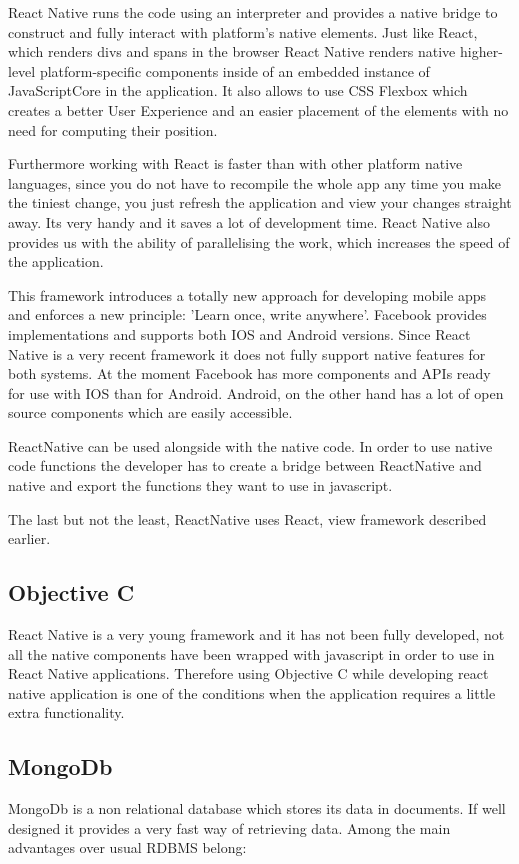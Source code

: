 \documentclass[thesis=M,english]{FITthesis}[2012/10/20]
\begin{document}
React Native runs the code using an interpreter and provides a native bridge to construct and fully interact with platform's native elements. Just like React, which renders divs and spans in the browser React Native renders native higher-level platform-specific components inside of an embedded instance of JavaScriptCore in the application. It also allows to use CSS Flexbox which creates a better User Experience and an easier placement of the elements with no need for computing their position.

Furthermore working with React is faster than with other platform native languages, since you do not have to recompile the whole app any time you make the tiniest change, you just refresh the application and view your changes straight away. Its very handy and it saves a lot of development time. React Native also provides us with the ability of parallelising the work, which increases the speed of the application.

This framework introduces a totally new approach for developing mobile apps and enforces a new principle: 'Learn once, write anywhere'. Facebook provides implementations and supports both IOS and Android versions. Since React Native is a very recent framework it does not fully support native features for both systems. At the moment Facebook has more components and APIs ready for use with IOS than for Android. Android, on the other hand has a lot of open source components which are easily accessible.

ReactNative can be used alongside with the native code. In order to use native code functions the developer has to create a bridge between ReactNative and native and export the functions they want to use in javascript.

The last but not the least, ReactNative uses React, view framework described earlier. \cite{react-fb-native}


\subsection{Objective C}

React Native is a very young framework and it has not been fully developed, not all the native components have been wrapped with javascript in order to use in React Native applications. Therefore using Objective C while developing react native application is one of the conditions when the application requires a little extra functionality.

\subsection{MongoDb}
MongoDb is a non relational database which stores its data in documents. If well designed it provides a very fast way of retrieving data. Among the main advantages over usual RDBMS belong:
\end{document}
